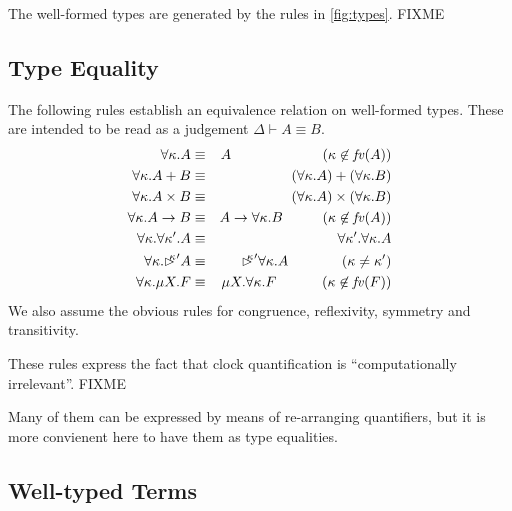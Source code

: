 The well-formed types are generated by the rules in
\autoref{fig:types}. FIXME

\subsection{Type Equality}\label{sec:type-equality}

The following rules establish an equivalence relation on well-formed
types. These are intended to be read as a judgement $\Delta \vdash A
\equiv B$.
\begin{eqnarray*}
  \forall \kappa. A & \equiv & A\hspace{2.3cm}(\kappa \not\in \mathit{fv}(A)) \\
  \forall \kappa. A + B & \equiv & (\forall \kappa. A) + (\forall \kappa. B) \\
  \forall \kappa. A \times B & \equiv & (\forall \kappa. A) \times (\forall \kappa. B) \\
  \forall \kappa. A \to B & \equiv & A \to \forall \kappa. B\hspace{1cm}(\kappa \not\in \mathit{fv}(A)) \\
  \forall \kappa. \forall \kappa'. A & \equiv & \forall \kappa'. \forall \kappa. A \\
  \forall \kappa. \mathord{\rhd\kern-0.4em^{\kappa}}' A & \equiv & \mathord{\rhd\kern-0.4em^{\kappa}}'\forall \kappa. A\hspace{1.35cm}(\kappa \not= \kappa') \\
  \forall \kappa. \mu X. F & \equiv & \mu X. \forall \kappa. F\hspace{1.15cm}(\kappa \not\in \mathit{fv}(F))
\end{eqnarray*}
We also assume the obvious rules for congruence, reflexivity, symmetry
and transitivity.

These rules express the fact that clock quantification is
``computationally irrelevant''. FIXME

Many of them can be expressed by means of re-arranging quantifiers,
but it is more convienent here to have them as type equalities.

\subsection{Well-typed Terms}\label{sec:typed-terms}

